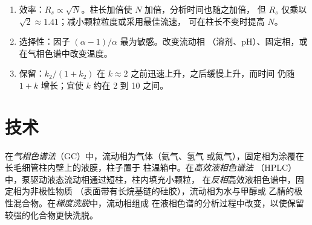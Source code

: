 \begin{method}[提高分离度]\label{met:b2:chromatography:improve-resolution}
\begin{enumerate}
  \item 效率：$R_s \propto \sqrt N$。柱长加倍使 $N$ 加倍，分析时间也随之加倍，
        但 $R_s$ 仅乘以 $\sqrt2 \approx 1.41$；减小颗粒粒度或采用最佳流速，
        可在柱长不变时提高 $N$。
  \item 选择性：因子 $(\alpha - 1)/\alpha$ 最为敏感。改变流动相
        （溶剂、pH）、固定相，或在气相色谱中改变温度。
  \item 保留：$k_2/(1+k_2)$ 在 $k \approx 2$ 之前迅速上升，之后缓慢上升，而时间
        仍随 $1 + k$ 增长；宜使 $k$ 约在 2 到 10 之间。
\end{enumerate}
\end{method}

\section{技术}

\begin{definition}[色谱技术]\label{def:b2:chromatography:techniques}
在\emph{气相色谱法}（GC）中，流动相为气体（氦气、氢气
或氮气），固定相为涂覆在长毛细管柱内壁上的液膜，柱子置于
柱温箱中。在\emph{高效液相色谱法}
（HPLC）中，泵驱动液态流动相通过短柱，柱内填充小颗粒，
在\emph{反相}高效液相色谱中，固定相为非极性物质
（表面带有长烷基链的硅胶），流动相为水与甲醇或
乙腈的极性混合物。在\emph{梯度洗脱}中，流动相组成
在液相色谱的分析过程中改变，以使保留较强的化合物更快洗脱。
\end{definition}

